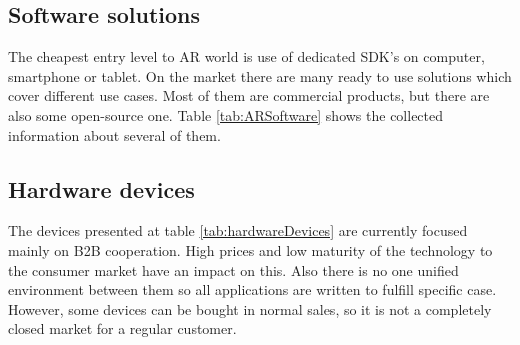 \documentclass[printmode,en]{mgr}
\begin{document}
\subsection{Software solutions}
The cheapest entry level to AR world is use of dedicated SDK's on computer, smartphone or tablet. On the market there are many ready to use solutions which cover different use cases. Most of them are commercial products, but there are also some open-source one. Table \ref{tab:ARSoftware} shows the collected information about several of them.

\subsection{Hardware devices}
The devices presented at table \ref{tab:hardwareDevices} are currently focused mainly on B2B cooperation. High prices and low maturity of the technology to the consumer market have an impact on this. Also there is no one unified environment between them so all applications are written to fulfill specific case. However, some devices can be bought in normal sales, so it is not a completely closed market for a regular customer.\\
\end{document}
